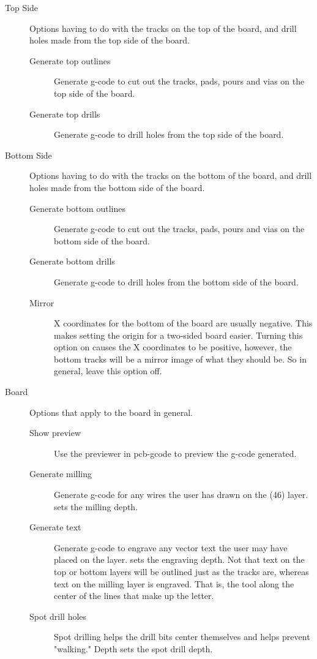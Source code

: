 \documentclass[11pt]{book}
\begin{document}
\begin{description}
	\item[Top Side] Options having to do with the tracks on the top of the board, and drill holes made from the top side of the board.
	\begin{description}
		\item[Generate top outlines] Generate g-code to cut out the tracks, pads, pours and vias on the top side of the board.
		\item[Generate top drills] Generate g-code to drill holes from the top side of the board.
	\end{description}
	\item[Bottom Side] Options having to do with the tracks on the bottom of the board, and drill holes made from the bottom side of the board.
	\begin{description}
		\item[Generate bottom outlines] Generate g-code to cut out the tracks, pads, pours and vias on the bottom side of the board.
		\item[Generate bottom drills] Generate g-code to drill holes from the bottom side of the board.
		\item[Mirror] X coordinates for the bottom of the board are usually negative. This makes setting the origin for a two-sided board easier. Turning this option on causes the X coordinates to be positive, however, the bottom tracks will be a mirror image of what they should be. So in general, leave this option off.
	\end{description}
	\item[Board] Options that apply to the board in general.
	\begin{description}
		\item[Show preview] Use the previewer in pcb-gcode to preview the g-code generated.
		\item[Generate milling] Generate g-code for any wires the user has drawn on the  (46) layer.  sets the milling depth.
		\item[Generate text] Generate g-code to engrave any vector text the user may have placed on the  layer.  sets the engraving depth. Not that text on the top or bottom layers will be outlined just as the tracks are, whereas text on the milling layer is engraved. That is, the tool along the center of the lines that make up the letter.
		\item[Spot drill holes] Spot drilling helps the drill bits center themselves and helps prevent "walking." Depth sets the spot drill depth.

\end{description}
\end{description}
\end{document}
